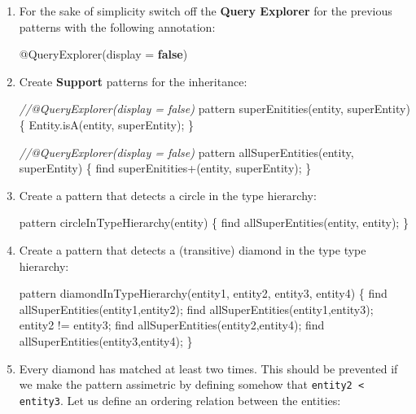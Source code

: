 \documentclass[]{report}
\newenvironment{Shaded}{}{}
\newcommand{\KeywordTok}[1]{\textcolor[rgb]{0.00,0.44,0.13}{\textbf{{#1}}}}
\newcommand{\CommentTok}[1]{\textcolor[rgb]{0.38,0.63,0.69}{\textit{{#1}}}}
\newcommand{\FunctionTok}[1]{\textcolor[rgb]{0.02,0.16,0.49}{{#1}}}
\newcommand{\NormalTok}[1]{{#1}}
\begin{document}
\begin{enumerate}
\def\labelenumi{\arabic{enumi}.}
\item
  For the sake of simplicity switch off the \textbf{Query Explorer} for
  the previous patterns with the following annotation:

\begin{Shaded}
\begin{Highlighting}[]
\FunctionTok{@QueryExplorer}\NormalTok{(display = }\KeywordTok{false}\NormalTok{)}
\end{Highlighting}
\end{Shaded}
\item
  Create \textbf{Support} patterns for the inheritance:

\begin{Shaded}
\begin{Highlighting}[]
\CommentTok{//@QueryExplorer(display = false)}
\NormalTok{pattern }\FunctionTok{superEnitities}\NormalTok{(entity, superEntity) \{}
    \NormalTok{Entity.}\FunctionTok{isA}\NormalTok{(entity, superEntity);}
\NormalTok{\}}

\CommentTok{//@QueryExplorer(display = false)}
\NormalTok{pattern }\FunctionTok{allSuperEntities}\NormalTok{(entity, superEntity) \{}
    \NormalTok{find superEnitities+(entity, superEntity);}
\NormalTok{\}}
\end{Highlighting}
\end{Shaded}
\item
  Create a pattern that detects a circle in the type hierarchy:

\begin{Shaded}
\begin{Highlighting}[]
\NormalTok{pattern }\FunctionTok{circleInTypeHierarchy}\NormalTok{(entity) \{}
    \NormalTok{find }\FunctionTok{allSuperEntities}\NormalTok{(entity, entity);}
\NormalTok{\}}
\end{Highlighting}
\end{Shaded}
\item
  Create a pattern that detects a (transitive) diamond in the type type
  hierarchy:

\begin{Shaded}
\begin{Highlighting}[]
\NormalTok{pattern }\FunctionTok{diamondInTypeHierarchy}\NormalTok{(entity1, entity2, entity3, entity4) \{}
    \NormalTok{find }\FunctionTok{allSuperEntities}\NormalTok{(entity1,entity2);}
    \NormalTok{find }\FunctionTok{allSuperEntities}\NormalTok{(entity1,entity3);}
    \NormalTok{entity2 != entity3;}
    \NormalTok{find }\FunctionTok{allSuperEntities}\NormalTok{(entity2,entity4);}
    \NormalTok{find }\FunctionTok{allSuperEntities}\NormalTok{(entity3,entity4);}
\NormalTok{\}}
\end{Highlighting}
\end{Shaded}
\item
  Every diamond has matched at least two times. This should be prevented
  if we make the pattern assimetric by defining somehow that
  \texttt{entity2 \textless{} entity3}. Let us define an ordering
  relation between the entities:


\end{enumerate}
\end{document}
